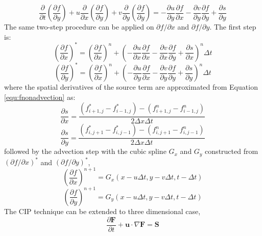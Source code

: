 \begin{equation}
\frac {\partial}{\partial t}(\frac{\partial f}{\partial y})  + u
\frac {\partial}{\partial x}(\frac {\partial f}{\partial y})+ v
\frac {\partial}{\partial y}(\frac {\partial f}{\partial y})=
-\frac {\partial u}{\partial y}\frac {\partial f}{\partial x}
-\frac {\partial v}{\partial y}\frac {\partial f}{\partial y}+
\frac{\partial s}{\partial y}
\end{equation}
The same two-step procedure can be applied on $\partial f/\partial x$ and $\partial f/\partial y$. The first step is:
\begin{equation}
(\frac{\partial f}{\partial x})^*=(\frac{\partial f}{\partial
x})^n+ (-\frac {\partial u}{\partial x}\frac {\partial f}{\partial
x} -\frac {\partial v}{\partial x}\frac {\partial f}{\partial y}+
\frac{\partial s}{\partial x})^n \Delta t
\label{equ:dfdxnonadvection}
\end{equation}
\begin{equation}
(\frac{\partial f}{\partial y})^*=(\frac{\partial f}{\partial
x})^n+ (-\frac {\partial u}{\partial y}\frac {\partial f}{\partial
x} -\frac {\partial v}{\partial y}\frac {\partial f}{\partial y}+
\frac{\partial s}{\partial y})^n \Delta t
\label{equ:dfdynonadvection}
\end{equation}
where the spatial derivatives of the source term are
approximated from Equation \ref{equ:fnonadvection} as:
\begin{equation}
\frac{\partial s}{\partial x}
=\frac{(f_{i+1,j}^*-f_{i-1,j}^*)-(f_{i+1,j}^n-f_{i-1,j}^n)
}{2\Delta x\Delta t}
\end{equation}
\begin{equation}
\frac{\partial s}{\partial y}
=\frac{(f_{i,j+1}^*-f_{i,j-1}^*)-(f_{i,j+1}^n-f_{i,j-1}^n)
}{2\Delta x\Delta t}
\end{equation}
followed by the advection step with the cubic spline $G_x$ and
$G_y$ constructed from $(\partial f/\partial x)^*$ and $(\partial
f/\partial y)^*$,
\begin{equation}
(\frac{\partial f}{\partial x})^{n+1}=G_x(x-u\Delta t, y-v\Delta
t, t-\Delta t)
\end{equation}
\begin{equation}
(\frac{\partial f}{\partial y})^{n+1}=G_y(x-u\Delta t, y-v\Delta
t, t-\Delta t)
\end{equation}
The CIP technique can be extended to three dimensional case,
\begin{equation}
\frac{\partial \textbf{F}}{\partial t}+\textbf{u}\cdot \nabla
\textbf{F}=\textbf{S}
\end{equation}
